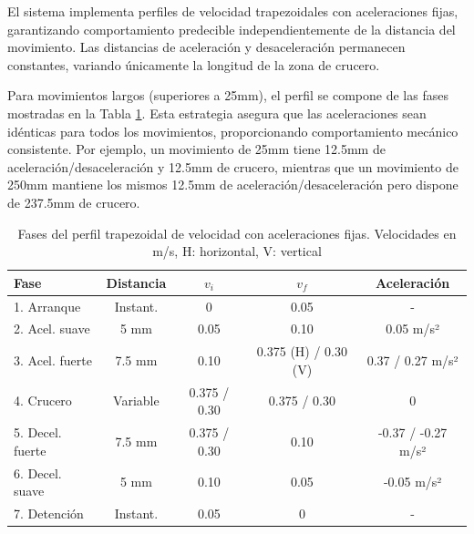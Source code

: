 El sistema implementa perfiles de velocidad trapezoidales con aceleraciones fijas, garantizando comportamiento predecible independientemente de la distancia del movimiento. Las distancias de aceleración y desaceleración permanecen constantes, variando únicamente la longitud de la zona de crucero.

Para movimientos largos (superiores a 25mm), el perfil se compone de las fases mostradas en la Tabla \ref{tab:perfil_trapezoidal}. Esta estrategia asegura que las aceleraciones sean idénticas para todos los movimientos, proporcionando comportamiento mecánico consistente. Por ejemplo, un movimiento de 25mm tiene 12.5mm de aceleración/desaceleración y 12.5mm de crucero, mientras que un movimiento de 250mm mantiene los mismos 12.5mm de aceleración/desaceleración pero dispone de 237.5mm de crucero.

\begin{table}[H]
\centering
\small
\begin{tabular}{|l|c|c|c|c|}
\hline
\textbf{Fase} & \textbf{Distancia} & \textbf{$v_i$} & \textbf{$v_f$} & \textbf{Aceleración} \\
\hline
1. Arranque & Instant. & 0 & 0.05 & - \\
\hline
2. Acel. suave & 5 mm & 0.05 & 0.10 & 0.05 m/s² \\
\hline
3. Acel. fuerte & 7.5 mm & 0.10 & 0.375 (H) / 0.30 (V) & 0.37 / 0.27 m/s² \\
\hline
4. Crucero & Variable & 0.375 / 0.30 & 0.375 / 0.30 & 0 \\
\hline
5. Decel. fuerte & 7.5 mm & 0.375 / 0.30 & 0.10 & -0.37 / -0.27 m/s² \\
\hline
6. Decel. suave & 5 mm & 0.10 & 0.05 & -0.05 m/s² \\
\hline
7. Detención & Instant. & 0.05 & 0 & - \\
\hline
\end{tabular}
\caption{Fases del perfil trapezoidal de velocidad con aceleraciones fijas. Velocidades en m/s, H: horizontal, V: vertical}
\label{tab:perfil_trapezoidal}
\end{table}

